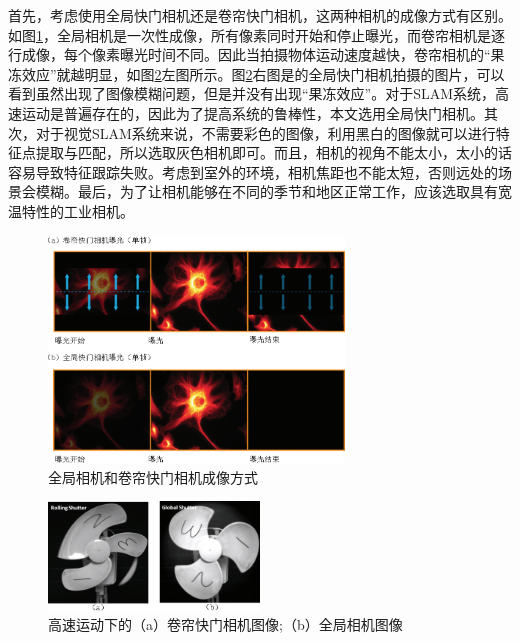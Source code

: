首先，考虑使用全局快门相机还是卷帘快门相机，这两种相机的成像方式有区别。如图\ref{fig2_6}，全局相机是一次性成像，所有像素同时开始和停止曝光，而卷帘相机是逐行成像，每个像素曝光时间不同。因此当拍摄物体运动速度越快，卷帘相机的“果冻效应”就越明显，如图\ref{fig2_7}左图所示。图\ref{fig2_7}右图是的全局快门相机拍摄的图片，可以看到虽然出现了图像模糊问题，但是并没有出现“果冻效应”。对于SLAM系统，高速运动是普遍存在的，因此为了提高系统的鲁棒性，本文选用全局快门相机。其次，对于视觉SLAM系统来说，不需要彩色的图像，利用黑白的图像就可以进行特征点提取与匹配，所以选取灰色相机即可。而且，相机的视角不能太小，太小的话容易导致特征跟踪失败。考虑到室外的环境，相机焦距也不能太短，否则远处的场景会模糊。最后，为了让相机能够在不同的季节和地区正常工作，应该选取具有宽温特性的工业相机。
\begin{figure}[h]\setlength{\belowcaptionskip}{-2pt}
	\centering
	\includegraphics[width=0.7\textwidth]{figures/chapter2/fig2_6}
	\caption{全局相机和卷帘快门相机成像方式}\label{fig2_6}
\end{figure}
\begin{figure}[h]\setlength{\belowcaptionskip}{-12pt}
	\centering
	\includegraphics[width=0.5\textwidth]{figures/chapter2/fig2_7}
	\caption{高速运动下的（a）卷帘快门相机图像;（b）全局相机图像}\label{fig2_7}
\end{figure}

